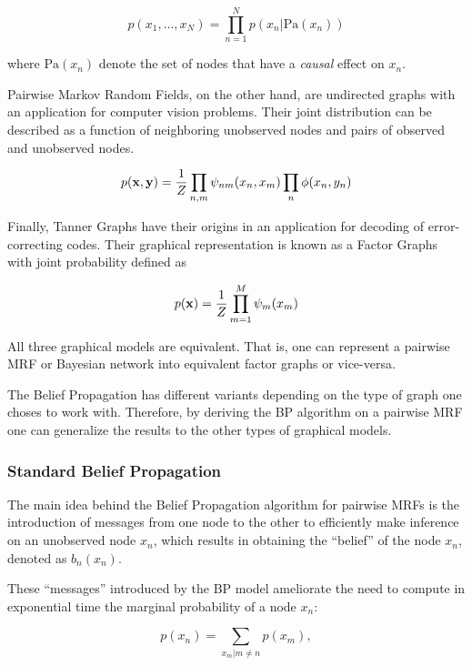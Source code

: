 \documentclass[11pt]{article}
\begin{document}
\begin{equation*}
	p(x_1, \ldots, x_N) = \prod_{n=1}^Np(x_n\vert \text{Pa}(x_n))
\end{equation*}

where $\text{Pa}(x_n)$ denote the set of nodes that have a \textit{causal} effect on $x_n$.

Pairwise Markov Random Fields, on the other hand, are undirected graphs with an application for computer vision problems. Their joint distribution can be described as a function of neighboring unobserved nodes and pairs of observed and unobserved nodes.

\begin{equation*}
	p({\bf x}, {\bf y}) = \frac{1}{Z}\prod_{n,m}\psi_{nm}(x_n, x_m)\prod_{n}\phi(x_n, y_n)
\end{equation*}

Finally, Tanner Graphs have their origins in an application for decoding of error-correcting codes. Their graphical representation is known as a Factor Graphs with joint probability defined as

\begin{equation*}
	p({\bf x}) = \frac{1}{Z}\prod_{m=1}^M \psi_m(x_m)
\end{equation*}

All three graphical models are equivalent. That is, one can represent a pairwise MRF or Bayesian network into equivalent factor graphs or vice-versa.

The Belief Propagation has different variants depending on the type of graph one choses to work with. Therefore, by deriving the BP algorithm on a pairwise MRF one can generalize the results to the other types of graphical models.

\subsubsection*{Standard Belief Propagation}
The main idea behind the Belief Propagation algorithm for pairwise MRFs is the introduction of messages from one node to the other to efficiently make inference on an unobserved node $x_n$, which results in obtaining the ``belief'' of the node $x_n$, denoted as $b_n(x_n)$.

These ``messages'' introduced by the BP model ameliorate the need to compute in exponential time the marginal probability of a node $x_n$:

\begin{equation*}
	p(x_n) = \sum_{x_m \vert m \neq n} p(x_m),
\end{equation*}
\end{document}
